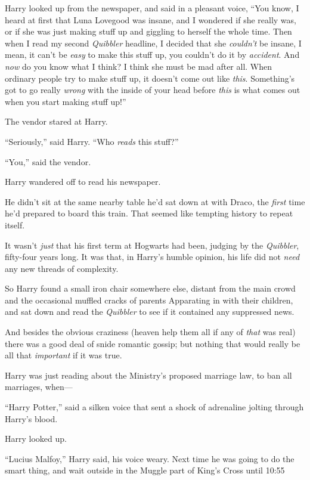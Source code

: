 Harry looked up from the newspaper, and said in a pleasant voice, “You know, I heard at first that Luna Lovegood was insane, and I wondered if she really was, or if she was just making stuff up and giggling to herself the whole time. Then when I read my second \emph{Quibbler} headline, I decided that she \emph{couldn’t} be insane, I mean, it can’t be \emph{easy} to make this stuff up, you couldn’t do it by \emph{accident}. And \emph{now} do you know what I think? I think she must be mad after all. When ordinary people try to make stuff up, it doesn’t come out like \emph{this}. Something’s got to go really \emph{wrong} with the inside of your head before \emph{this} is what comes out when you start making stuff up!”

The vendor stared at Harry.

“Seriously,” said Harry. “Who \emph{reads} this stuff?”

“You,” said the vendor.

Harry wandered off to read his newspaper.

He didn’t sit at the same nearby table he’d sat down at with Draco, the \emph{first} time he’d prepared to board this train. That seemed like tempting history to repeat itself.

It wasn’t \emph{just} that his first term at Hogwarts had been, judging by the \emph{Quibbler}, fifty-four years long. It was that, in Harry’s humble opinion, his life did not \emph{need} any new threads of complexity.

So Harry found a small iron chair somewhere else, distant from the main crowd and the occasional muffled cracks of parents Apparating in with their children, and sat down and read the \emph{Quibbler} to see if it contained any suppressed news.

And besides the obvious craziness (heaven help them all if any of \emph{that} was real) there was a good deal of snide romantic gossip; but nothing that would really be all that \emph{important} if it was true.

Harry was just reading about the Ministry’s proposed marriage law, to ban all marriages, when—

“Harry Potter,” said a silken voice that sent a shock of adrenaline jolting through Harry’s blood.

Harry looked up.

“Lucius Malfoy,” Harry said, his voice weary. Next time he was going to do the smart thing, and wait outside in the Muggle part of King’s Cross until 10:55\am

